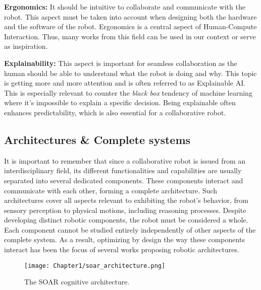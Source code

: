 \textbf{Ergonomics:} It should be intuitive to collaborate and communicate with the robot. This aspect must be taken into account when designing both the hardware and the software of the robot. Ergonomics is a central aspect of Human-Compute Interaction. Thus, many works from this field can be used in our context or serve as inspiration.

\textbf{Explainability:} This aspect is important for seamless collaboration as the human should be able to understand what the robot is doing and why. This topic is getting more and more attention and is often referred to as Explainable AI. This is especially relevant to counter the \textit{black box} tendency of machine learning where it's impossible to explain a specific decision. Being explainable often enhances predictability, which is also essential for a collaborative robot.

\subsection{Architectures \& Complete systems}

It is important to remember that since a collaborative robot is issued from an interdisciplinary field, its different functionalities and capabilities are usually separated into several dedicated components. These components interact and communicate with each other, forming a complete architecture. Such architectures cover all aspects relevant to exhibiting the robot's behavior, from sensory perception to physical motions, including reasoning processes. 
Despite developing distinct robotic components, the robot must be considered a whole. Each component cannot be studied entirely independently of other aspects of the complete system. As a result, optimizing by design the way these components interact has been the focus of several works proposing robotic architectures.

\begin{figure}
    \center
    \texttt{[image: Chapter1/soar\_architecture.png]}
    \caption{The SOAR cognitive architecture.}
    \label{fig:soar}
\end{figure}

